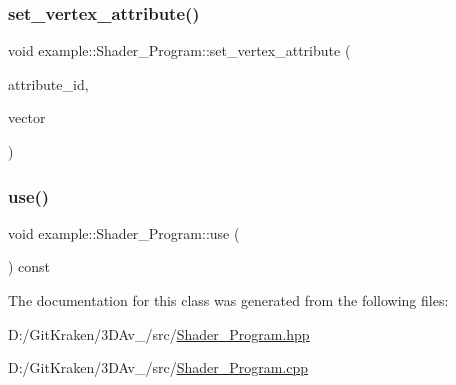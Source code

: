 \subsubsection{\texorpdfstring{set\+\_\+vertex\+\_\+attribute()}{set\_vertex\_attribute()}\hspace{0.1cm}{\footnotesize\ttfamily [4/4]}}
{\footnotesize\ttfamily void example\+::\+Shader\+\_\+\+Program\+::set\+\_\+vertex\+\_\+attribute (\begin{DoxyParamCaption}\item[{G\+Lint}]{attribute\+\_\+id,  }\item[{const Vector4f \&}]{vector }\end{DoxyParamCaption})\hspace{0.3cm}{\ttfamily [inline]}}

\mbox{\label{classexample_1_1_shader___program_a70c29ba798a57a71ca2b74463f5ffe19}} 
\subsubsection{\texorpdfstring{use()}{use()}}
{\footnotesize\ttfamily void example\+::\+Shader\+\_\+\+Program\+::use (\begin{DoxyParamCaption}{ }\end{DoxyParamCaption}) const\hspace{0.3cm}{\ttfamily [inline]}}



The documentation for this class was generated from the following files\+:\begin{DoxyCompactItemize}
\item 
D\+:/\+Git\+Kraken/3\+D\+Av\+\_/src/\mbox{\hyperlink{_shader___program_8hpp}{Shader\+\_\+\+Program.\+hpp}}\item 
D\+:/\+Git\+Kraken/3\+D\+Av\+\_/src/\mbox{\hyperlink{_shader___program_8cpp}{Shader\+\_\+\+Program.\+cpp}}\end{DoxyCompactItemize}
